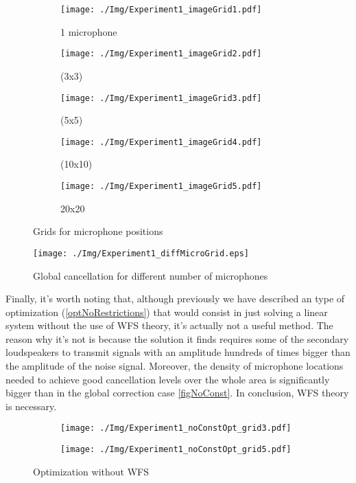 \begin{figure}
	\centering
	\begin{subfigure}[b]{0.3\textwidth}
		\centering
		\texttt{[image: ./Img/Experiment1\_imageGrid1.pdf]}
		\caption{1 microphone}
	\end{subfigure}
	\begin{subfigure}[b]{0.3\textwidth}
		\centering
		\texttt{[image: ./Img/Experiment1\_imageGrid2.pdf]}
		\caption{(3x3)}
	\end{subfigure}
	\begin{subfigure}[b]{0.3\textwidth}
		\centering
		\texttt{[image: ./Img/Experiment1\_imageGrid3.pdf]}
		\caption{(5x5)}
	\end{subfigure}
	\begin{subfigure}[b]{0.3\textwidth}
		\centering
		\texttt{[image: ./Img/Experiment1\_imageGrid4.pdf]}
		\caption{(10x10)}
	\end{subfigure}
	\begin{subfigure}[b]{0.3\textwidth}
		\centering
		\texttt{[image: ./Img/Experiment1\_imageGrid5.pdf]}
		\caption{20x20}
	\end{subfigure}
	\caption{Grids for microphone positions}
	\label{figGrids}
\end{figure}

\begin{figure}
	\centering
	\texttt{[image: ./Img/Experiment1\_diffMicroGrid.eps]}
	\caption[Global cancellation for different number of microphones]{Global cancellation for different number of microphones}
	\label{figDiffMicroGridsCanc}
\end{figure}

Finally, it's worth noting that, although previously we have described an type of optimization (\autoref{optNoRestrictions}) that would consist in just solving a linear system without the use of WFS theory, it's actually not a useful method. The reason why it's not is because the solution it finds requires some of the secondary loudspeakers to transmit signals with an amplitude hundreds of times bigger than the amplitude of the noise signal. Moreover, the density of microphone locations needed to achieve good cancellation levels over the whole area is significantly bigger than in the global correction case \autoref{figNoConst}. In conclusion, WFS theory is necessary.

\begin{figure}
	\centering
	\begin{subfigure}[b]{0.49\textwidth}
		\centering
		\texttt{[image: ./Img/Experiment1\_noConstOpt\_grid3.pdf]}
		\caption{}
	\end{subfigure}
	\begin{subfigure}[b]{0.49\textwidth}
		\centering
		\texttt{[image: ./Img/Experiment1\_noConstOpt\_grid5.pdf]}
		\caption{}
	\end{subfigure}
	\caption{Optimization without WFS}
	\label{figNoConst}
\end{figure}


